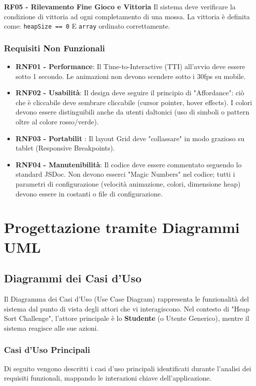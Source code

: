 \documentclass[openany]{theme/uniprthesis}
\begin{document}
\noindent
\textbf{RF05 - Rilevamento Fine Gioco e Vittoria}
Il sistema deve verificare la condizione di vittoria ad ogni completamento di una mossa. La vittoria è definita come: \texttt{heapSize == 0} E \texttt{array}  ordinato correttamente.

\subsection{Requisiti Non Funzionali}
\begin{itemize}
    \item \textbf{RNF01 - Performance}: Il Time-to-Interactive (TTI) all'avvio deve essere sotto 1 secondo. Le animazioni non devono scendere sotto i 30fps su mobile.
    \item \textbf{RNF02 - Usabilità}: Il design deve seguire il principio di "Affordance": ciò che è cliccabile deve sembrare cliccabile (cursor pointer, hover effects). I colori devono essere distinguibili anche da utenti daltonici (uso di simboli o pattern oltre al colore rosso/verde).
    \item \textbf{RNF03 - Portabilit }: Il layout Grid deve "collassare" in modo grazioso su tablet (Responsive Breakpoints).
    \item \textbf{RNF04 - Manutenibilità}: Il codice deve essere commentato seguendo lo standard JSDoc. Non devono esserci "Magic Numbers" nel codice; tutti i parametri di configurazione (velocità animazione, colori, dimensione heap) devono essere in costanti o file di configurazione.
\end{itemize}

\chapter{Progettazione tramite Diagrammi UML}

\section{Diagrammi dei Casi d'Uso}
Il Diagramma dei Casi d'Uso (Use Case Diagram) rappresenta le funzionalità del sistema dal punto di vista degli attori che vi interagiscono. Nel contesto di "Heap Sort Challenge", l'attore principale è lo \textbf{Studente} (o Utente Generico), mentre il sistema reagisce alle sue azioni.

\subsection{Casi d'Uso Principali}
Di seguito vengono descritti i casi d'uso principali identificati durante l'analisi dei requisiti funzionali, mappando le interazioni chiave dell'applicazione.
\end{document}
